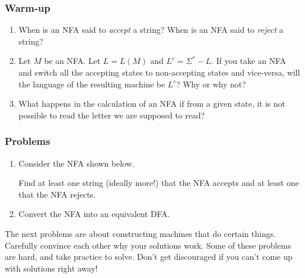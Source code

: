 \documentclass{amsart}
\begin{document}
\subsubsection{Warm-up}
\label{sec:org5c2c01a}
\begin{enumerate}
\item When is an NFA said to \emph{accept} a string? When is an NFA said to \emph{reject} a string?
\item Let \(M\) be an NFA. Let \(L = L(M)\) and \(L^{c} = \Sigma^{\ast} - L\). If you take an NFA and switch all the accepting states to non-accepting states and vice-versa, will the language of the resulting machine be \(L^c\)? Why or why not?
\item What happens in the calculation of an NFA if from a given state, it is not possible to read the letter we are supposed to read?
\end{enumerate}
\subsubsection{Problems}
\label{sec:orgb55cbcc}
\begin{enumerate}
\item Consider the NFA shown below. 
\begin{center}
\end{center}
Find at least one string (ideally more!) that the NFA accepts and at least one that the NFA rejects.

\item Convert the NFA into an equivalent DFA.
\end{enumerate}

The next problems are about constructing machines that do certain things.
Carefully convince each other why your solutions work.
Some of these problems are hard, and take practice to solve. Don't get discouraged if you can't come up with solutions right away!
\end{document}
